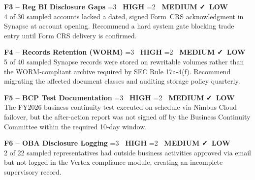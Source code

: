 \documentclass[11pt,a4paper]{scrreprt}
\newcommand{\severitytag}[1]{%
  \ifnum#1=3
    {\color{riskhigh}\bfseries\faExclamationTriangle\ HIGH}%
  \else\ifnum#1=2
    {\color{riskmed}\bfseries\faExclamationTriangle\ MEDIUM}%
  \else
    {\color{risklow}\bfseries\faCheck\ LOW}%
  \fi\fi
}
\begin{document}
\vspace{4pt}
\begin{minipage}{0.485\linewidth}
\begin{tcolorbox}[colback=riskmed!6,colframe=riskmed,arc=2pt,boxrule=0.9pt,left=7pt,right=7pt,top=5pt,bottom=5pt]
\textbf{\small F3 -- Reg BI Disclosure Gaps} \hfill \severitytag{2}\\[2pt]
{\footnotesize 4 of 30 sampled accounts lacked a dated, signed Form~CRS acknowledgment in
Synapse at account opening. Recommend a hard system gate blocking trade entry until Form
CRS delivery is confirmed.}
\end{tcolorbox}
\end{minipage}\hfill
\begin{minipage}{0.485\linewidth}
\begin{tcolorbox}[colback=riskmed!6,colframe=riskmed,arc=2pt,boxrule=0.9pt,left=7pt,right=7pt,top=5pt,bottom=5pt]
\textbf{\small F4 -- Records Retention (WORM)} \hfill \severitytag{2}\\[2pt]
{\footnotesize 5 of 40 sampled Synapse records were stored on rewritable volumes rather than
the WORM-compliant archive required by SEC Rule 17a-4(f). Recommend migrating the affected
document classes and auditing storage policy quarterly.}
\end{tcolorbox}
\end{minipage}
\par
\vspace{6pt}
\begin{minipage}{0.485\linewidth}
\begin{tcolorbox}[colback=risklow!6,colframe=risklow,arc=2pt,boxrule=0.9pt,left=7pt,right=7pt,top=5pt,bottom=5pt]
\textbf{\small F5 -- BCP Test Documentation} \hfill \severitytag{1}\\[2pt]
{\footnotesize The FY2026 business continuity test executed on schedule via Nimbus Cloud
failover, but the after-action report was not signed off by the Business Continuity
Committee within the required 10-day window.}
\end{tcolorbox}
\end{minipage}\hfill
\begin{minipage}{0.485\linewidth}
\begin{tcolorbox}[colback=risklow!6,colframe=risklow,arc=2pt,boxrule=0.9pt,left=7pt,right=7pt,top=5pt,bottom=5pt]
\textbf{\small F6 -- OBA Disclosure Logging} \hfill \severitytag{1}\\[2pt]
{\footnotesize 2 of 22 sampled representatives had outside business activities approved via
email but not logged in the Vertex compliance module, creating an incomplete supervisory
record.}
\end{tcolorbox}
\end{minipage}
\par
\end{document}

